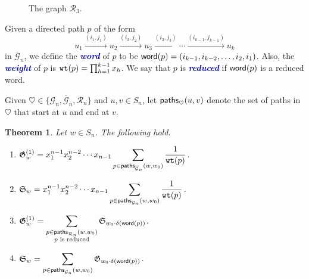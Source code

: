 \documentclass[12 pt]{amsart}
\newcommand{\newword}[1]{\textcolor{darkblue}{\textbf{\emph{#1}}}}
\newcommand{\paths}{{\sf paths}}
\newcommand{\word}{{\sf word}}
\newtheorem{theorem}[Theorem]{Theorem}
\numberwithin{equation}{section}
\theoremstyle{remark}
\newcommand{\demprod}{\delta}
\newcommand{\wt}{{\tt wt}}
\begin{document}
			\begin{figure}
			\caption{The graph $\mathcal{R}_3$.}
			\label{figure:R3graph}
		\end{figure}
		
		Given a directed path $p$ of the form 
		\[u_1\xrightarrow{(i_1,j_1)}u_2 \xrightarrow{(i_2,j_2)} u_3\xrightarrow{(i_3,j_3)} \cdots \xrightarrow{(i_{k-1},j_{k-1})} u_k\] 
		in $\overline{\mathcal{G}}_n$, we define the \newword{word} of $p$ to be $\word(p) = (i_{k-1},i_{k-2},\ldots, i_2, i_{1})$. Also, the \newword{weight} of $p$ is $\wt(p)=\prod_{h=1}^{k-1} x_h$.
		We say that $p$ is \newword{reduced} if $\word(p)$ is a reduced word. 
		
		Given $\heartsuit\in\{\mathcal{G}_n,\overline{\mathcal{G}}_n,\mathcal{R}_n\}$ and $u,v \in S_n$, let $\paths_\heartsuit(u,v)$ denote the set of paths in $\heartsuit$ that start at $u$ and end at $v$. 
		
		\begin{theorem}
			\label{thm:pathformulas}
			Let $w\in S_n$. The following hold.
			\begin{enumerate}
				\item $\displaystyle \mathfrak G_w^{(1)}=x_1^{n-1}x_2^{n-2}\cdots x_{n-1} \sum_{p\in \paths_{\overline{\mathcal{G}}_n}(w,w_0)}\frac{1}{\wt(p)}$.
				\item $\displaystyle \mathfrak S_w=x_1^{n-1}x_2^{n-2}\cdots x_{n-1} \sum_{p\in \paths_{\mathcal{G}_n}(w,w_0)}\frac{1}{\wt(p)}$.
				\item $\displaystyle\mathfrak{G}_w^{(1)} = \sum_{\substack{p \in \paths_{\mathcal{R}_n}(w,w_0)\\p \text{ is reduced}}}\mathfrak{S}_{w_0 \cdot \demprod(\word(p))}$.
				\item $\displaystyle\mathfrak{S}_w = \sum_{p \in \paths_{\mathcal{G}_n}(w,w_0)}\mathfrak{G}_{w_0 \cdot \demprod(\word(p))}$.
			\end{enumerate}
		\end{theorem}
	
\end{document}
